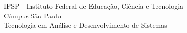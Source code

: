 \documentclass[
	12pt,				%
	openany,			%
	twoside,			%
	a4paper,			%
	english,			%
	brazil				%
	]{abntex2}
\begin{document}
\begin{folhadeaprovacao}

  \begin{center}
    {\ABNTEXchapterfont\large\imprimirautor}

    \vspace*{\fill}\vspace*{\fill}
    \begin{center}
      \ABNTEXchapterfont\bfseries\Large\imprimirtitulo
    \end{center}
    \vspace*{\fill}
    
    \hspace{.45\textwidth}
    \begin{minipage}{.5\textwidth}
        \imprimirpreambulo
    \end{minipage}%

    \vspace*{1.5cm} %

    \begin{center}
        IFSP - Instituto Federal de Educação, Ciência e Tecnologia \\
        Câmpus São Paulo \\
        Tecnologia em Análise e Desenvolvimento de Sistemas
    \end{center}

    \vspace*{0.8cm} %

  \end{center}

  \begin{center}
    {\large\imprimirlocal}
    \par
    {\large\imprimirdata}
  \end{center}

\end{folhadeaprovacao}







\end{document}

